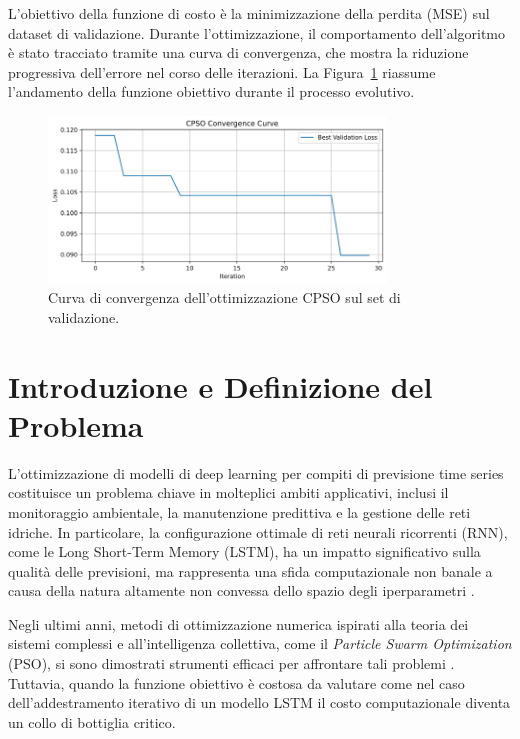 \documentclass{article}
\begin{document}
L’obiettivo della funzione di costo è la minimizzazione della perdita (MSE) sul dataset di validazione. 
Durante l’ottimizzazione, il comportamento dell’algoritmo è stato tracciato tramite una curva di 
convergenza, che mostra la riduzione progressiva dell’errore nel corso delle iterazioni. 
La Figura~\ref{fig:cpso} riassume l’andamento della funzione obiettivo durante il processo evolutivo.

\begin{figure}[H]
    \centering
    \includegraphics[width=0.8\textwidth]{img/CPSO Convergence Curve.png}
    \caption{Curva di convergenza dell’ottimizzazione CPSO sul set di validazione.}
    \label{fig:cpso}
\end{figure}


\section{Introduzione e Definizione del Problema}

L'ottimizzazione di modelli di deep learning per compiti di previsione time series costituisce un 
problema chiave in molteplici ambiti applicativi, inclusi il monitoraggio ambientale, la manutenzione 
predittiva e la gestione delle reti idriche. In particolare, la configurazione ottimale di reti neurali 
ricorrenti (RNN), come le Long Short-Term Memory (LSTM), ha un impatto significativo sulla qualità delle 
previsioni, ma rappresenta una sfida computazionale non banale a causa della natura altamente non 
convessa dello spazio degli iperparametri \cite{bergstra2012random}.

Negli ultimi anni, metodi di ottimizzazione numerica ispirati alla teoria dei sistemi complessi e 
all'intelligenza collettiva, come il \textit{Particle Swarm Optimization} (PSO), si sono dimostrati 
strumenti efficaci per affrontare tali problemi \cite{kennedy1995particle, eberhart2001pso}. Tuttavia, 
quando la funzione obiettivo è costosa da valutare come nel caso dell'addestramento iterativo di un 
modello LSTM il costo computazionale diventa un collo di bottiglia critico.
\end{document}
